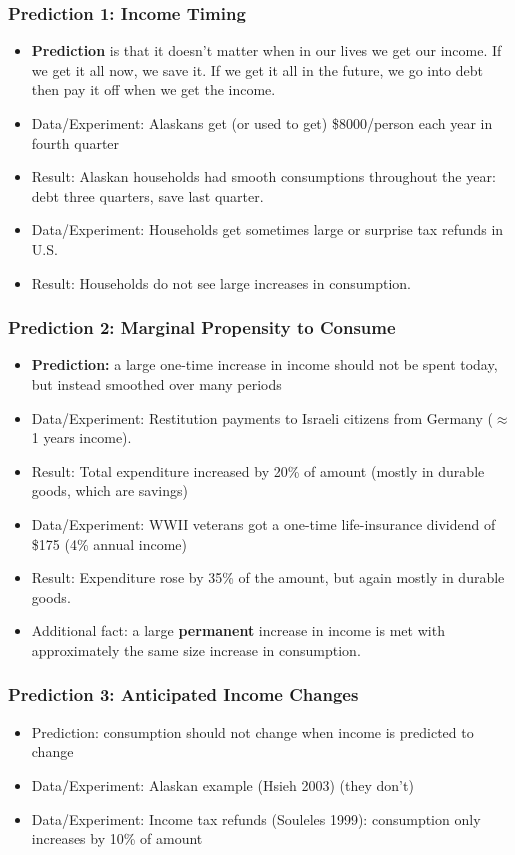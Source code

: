 \documentclass{beamer}
\begin{document}
\begin{frame}
\frametitle{Prediction 1: Income Timing}
\begin{itemize}
\item \textbf{Prediction} is that it doesn't matter when in our lives we get our income.  If we get it all now, we save it.  If we get it all in the future, we go into debt then pay it off when we get the income.  
\bigskip
\item Data/Experiment:  Alaskans get (or used to get) \$8000/person each year in fourth quarter
\bigskip
\item Result:  Alaskan households had smooth consumptions throughout the year: debt three quarters, save last quarter.
\bigskip
\item Data/Experiment:  Households get sometimes large or surprise tax refunds in U.S.
\bigskip
\item Result:  Households do not see large increases in consumption.
\end{itemize}
\end{frame}


\begin{frame}
\frametitle{Prediction 2: Marginal Propensity to Consume}
\begin{itemize}
\item \textbf{Prediction:}  a large one-time increase in income should not be spent today, but instead smoothed over many periods  
\bigskip
\item Data/Experiment:  Restitution payments to Israeli citizens from Germany ($\approx$ 1 years income).
\bigskip
\item Result:  Total expenditure increased by 20\% of amount (mostly in durable goods, which are savings)
\bigskip
\item Data/Experiment:  WWII veterans got a one-time life-insurance dividend of \$175 (4\% annual income)
\bigskip
\item Result:  Expenditure rose by 35\% of the amount, but again mostly in durable goods.
\bigskip
\item Additional fact:  a large \textbf{permanent} increase in income is met with approximately the same size increase in consumption. 
\end{itemize}
\end{frame}

\begin{frame}
\frametitle{Prediction 3: Anticipated Income Changes}
\begin{itemize}
\item Prediction:  consumption should not change when income is predicted to change
\bigskip
\item Data/Experiment:  Alaskan example (Hsieh 2003) (they don't)
\bigskip
\item Data/Experiment: Income tax refunds (Souleles 1999):  consumption only increases by 10\% of amount 
\end{itemize}
\end{frame}
\end{document}
